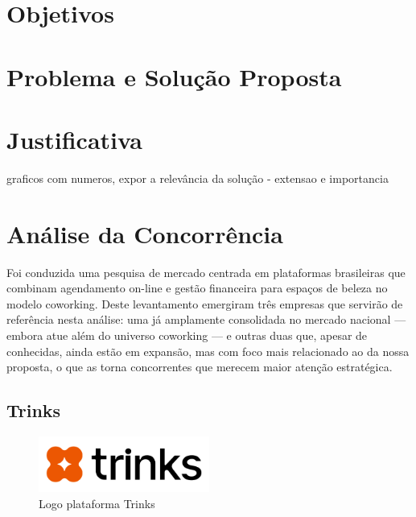 
\section{Objetivos}
\section{Problema e Solução Proposta}
\section{Justificativa}
graficos com numeros, expor a relevância da solução - extensao e importancia
\section{Análise da Concorrência}

Foi conduzida uma pesquisa de mercado centrada em plataformas brasileiras que combinam agendamento on-line e gestão financeira para espaços de beleza no modelo coworking. Deste levantamento emergiram três empresas que servirão de referência nesta análise: uma já amplamente consolidada no mercado nacional — embora atue além do universo coworking — e outras duas que, apesar de conhecidas, ainda estão em expansão, mas com foco mais relacionado ao da nossa proposta, o que as torna concorrentes que merecem maior atenção estratégica.

\subsection{Trinks}

\begin{figure}[htb]
	\centering
	\includegraphics[width=0.5\textwidth]{cap01-Introducao/Images/1.4.1_Trinks}
	\caption{Logo plataforma Trinks}
	\label{fig:Trinks}
\end{figure}

